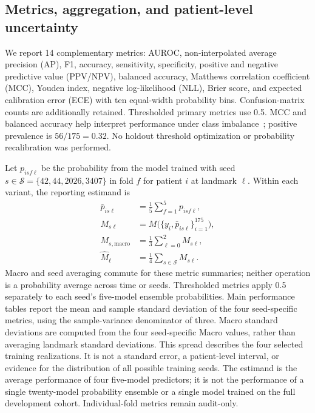 \subsection{Metrics, aggregation, and patient-level uncertainty}
We report 14 complementary metrics: AUROC, non-interpolated average precision (AP), F1, accuracy, sensitivity, specificity, positive and negative predictive value (PPV/NPV), balanced accuracy, Matthews correlation coefficient (MCC), Youden index, negative log-likelihood (NLL), Brier score, and expected calibration error (ECE) with ten equal-width probability bins. Confusion-matrix counts are additionally retained. Thresholded primary metrics use 0.5. MCC and balanced accuracy help interpret performance under class imbalance~\citep{chicco2020mcc}; positive prevalence is $56/175=0.32$. No holdout threshold optimization or probability recalibration was performed.

Let $p_{isf\ell}$ be the probability from the model trained with seed $s\in\mathcal{S}=\{42,44,2026,3407\}$ in fold $f$ for patient $i$ at landmark $\ell$. Within each variant, the reporting estimand is
\begin{equation}
\begin{aligned}
 \bar p_{is\ell}&=\frac{1}{5}\sum_{f=1}^{5}p_{isf\ell},\\
 M_{s\ell}&=M\bigl(\{y_i,\bar p_{is\ell}\}_{i=1}^{175}\bigr),\\
 M_{s,\mathrm{macro}}&=\frac{1}{3}\sum_{\ell=0}^{2}M_{s\ell},\\
 \widehat M_\ell&=\frac{1}{4}\sum_{s\in\mathcal{S}}M_{s\ell}.
\end{aligned}
\end{equation}
Macro and seed averaging commute for these metric summaries; neither operation is a probability average across time or seeds. Thresholded metrics apply 0.5 separately to each seed's five-model ensemble probabilities. Main performance tables report the mean and sample standard deviation of the four seed-specific metrics, using the sample-variance denominator of three. Macro standard deviations are computed from the four seed-specific Macro values, rather than averaging landmark standard deviations. This spread describes the four selected training realizations. It is not a standard error, a patient-level interval, or evidence for the distribution of all possible training seeds. The estimand is the average performance of four five-model predictors; it is not the performance of a single twenty-model probability ensemble or a single model trained on the full development cohort. Individual-fold metrics remain audit-only.

